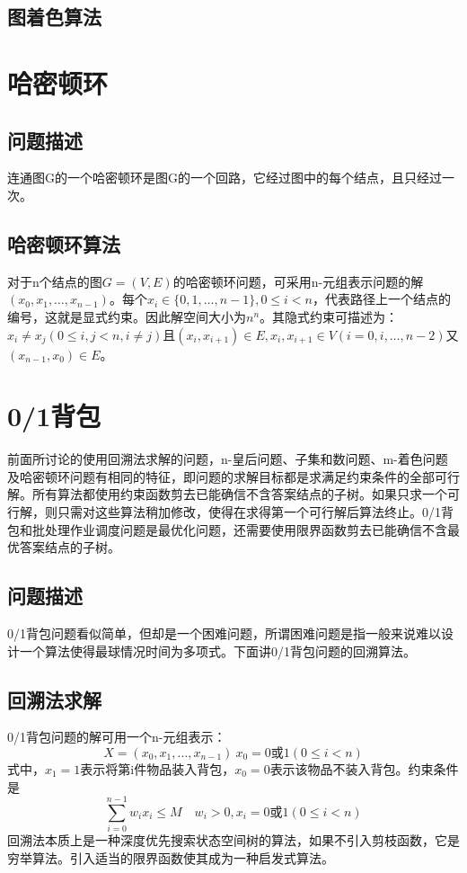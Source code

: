 \subsection*{图着色算法}
\section{哈密顿环}
\subsection*{问题描述}
连通图G的一个哈密顿环是图G的一个回路，它经过图中的每个结点，且只经过一次。
\subsection*{哈密顿环算法}
对于n个结点的图$G=(V,E)$的哈密顿环问题，可采用n-元组表示问题的解$(x_0,x_1,\dots,x_{n-1})$。每个$x_i\in \{0,1,\dots,n-1\},0\leq i<n$，代表路径上一个结点的编号，这就是显式约束。因此解空间大小为$n^n$。其隐式约束可描述为：$x_i\ne x_j(0\leq i,j<n,i\ne j)$且$(x_i,x_{i+1})\in E,x_i,x_{i+1}\in V(i=0,i,\dots,n-2)$又$(x_{n-1},x_0)\in E$。
\section{0/1背包}
前面所讨论的使用回溯法求解的问题，n-皇后问题、子集和数问题、m-着色问题及哈密顿环问题有相同的特征，即问题的求解目标都是求满足约束条件的全部可行解。所有算法都使用约束函数剪去已能确信不含答案结点的子树。如果只求一个可行解，则只需对这些算法稍加修改，使得在求得第一个可行解后算法终止。0/1背包和批处理作业调度问题是最优化问题，还需要使用限界函数剪去已能确信不含最优答案结点的子树。
\subsection*{问题描述}
0/1背包问题看似简单，但却是一个困难问题，所谓困难问题是指一般来说难以设计一个算法使得最球情况时间为多项式。下面讲0/1背包问题的回溯算法。
\subsection*{回溯法求解}
0/1背包问题的解可用一个n-元组表示：
\begin{equation}
	X=(x_0,x_1,\dots,x_{n-1})\ x_0=0\text{或}1(0\leq i<n)
\end{equation}
式中，$x_1=1$表示将第i件物品装入背包，$x_0=0$表示该物品不装入背包。约束条件是
\begin{equation}
	\sum_{i=0}^{n-1}w_ix_i\leq M\quad w_i>0,x_i=0\text{或}1(0\leq i<n)
\end{equation}
回溯法本质上是一种深度优先搜索状态空间树的算法，如果不引入剪枝函数，它是穷举算法。引入适当的限界函数使其成为一种启发式算法。

